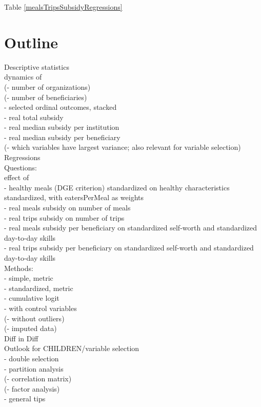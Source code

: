 \documentclass[12pt, a4paper, titlepage]{article}\usepackage[]{graphicx}\usepackage[]{color}
\begin{document}
Table \ref{mealsTripsSubsidyRegressions}
\section{Outline}
Descriptive statistics\\
dynamics of\\ 
(- number of organizations)\\
(- number of beneficiaries)\\
- selected ordinal outcomes, stacked\\
- real total subsidy\\
- real median subsidy per institution\\
- real median subsidy per beneficiary\\
(- which variables have largest variance; also relevant for variable selection)\\

Regressions\\

Questions:\\
effect of\\
- healthy meals (DGE criterion) standardized on healthy characteristics standardized, with eatersPerMeal as weights\\
- real meals subsidy on number of meals\\
- real trips subsidy on number of trips\\
- real meals subsidy per beneficiary on standardized self-worth and standardized day-to-day skills\\
- real trips subsidy per beneficiary on standardized self-worth and standardized day-to-day skills\\

Methods:\\
- simple, metric\\
- standardized, metric\\
- cumulative logit\\
- with control variables\\
(- without outliers)\\
(- imputed data)\\

Diff in Diff\\

Outlook for CHILDREN/variable selection\\
- double selection \\
- partition analysis\\
(- correlation matrix)\\
(- factor analysis)\\
- general tips\\
\end{document}
